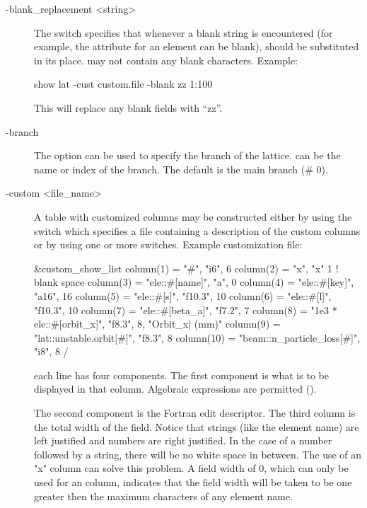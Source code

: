 {{{{{{{{\begin{description}
%
\item[-blank_replacement <string>] \Newline
The  switch specifies that whenever a blank string is encountered (for
example, the  attribute for an element can be blank),  should be substituted
in its place.  may not contain any blank characters. Example:
\begin{example}
  show lat -cust custom.file -blank zz 1:100
\end{example}
This will replace any blank fields with ``zz''.
%
\item[-branch] \Newline
The  option can be used to specify the branch of the lattice.
 can be the name or index of the branch.  The default is the main branch (\# 0).
%
\item[-custom <file_name>] \Newline
A table with customized columns may be constructed either by using the  switch which
specifies a file containing a description of the custom columns or by using one or more
 switches. Example customization file:
\begin{example}
  &custom_show_list
    column(1)  = "#",                      "i6",     6 
    column(2)  = "x",                      "x"       1   ! blank space
    column(3)  = "ele::#[name]",           "a",      0
    column(4)  = "ele::#[key]",            "a16",   16
    column(5)  = "ele::#[s]",              "f10.3", 10
    column(6)  = "ele::#[l]",              "f10.3", 10
    column(7)  = "ele::#[beta_a]",         "f7.2",   7
    column(8)  = "1e3 * ele::#[orbit_x]",  "f8.3",   8, "Orbit_x| (mm)" 
    column(9)  = "lat::unstable.orbit[#]", "f8.3",   8 
    column(10) = "beam::n_particle_loss[#]", "i8",   8 
  /
\end{example}
each  line has four components. The first component is what is to be displayed in that
column. Algebraic expressions are permitted ().

The second component is the Fortran edit descriptor. The third column is the total width of the
field. Notice that strings (like the element name) are left justified and numbers are right
justified. In the case of a number followed by a string, there will be no white space in
between. The use of an "x" column can solve this problem. A field width of 0, which can only be used
for an  column, indicates that the field width will be taken to be one greater
then the maximum characters of any element name.


\end{description}}}}}}}}}
